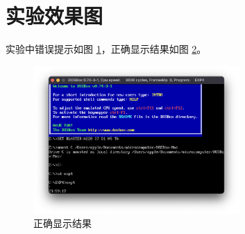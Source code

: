 \documentclass[11pt]{SEU-Digital-Report}
\begin{document}
\section{实验效果图}
实验中错误提示如图 \ref{fig:wrong}，正确显示结果如图 \ref{fig:right}。
\begin{figure}[htbp]
    \centering
    \caption{}
    \label{fig:wrong}
\end{figure}

\begin{figure}[htbp]
    \centering
    \includegraphics[width=0.7\textwidth]{fig/rlt00002.png}
    \caption{正确显示结果}
    \label{fig:right}
\end{figure}
\end{document}
